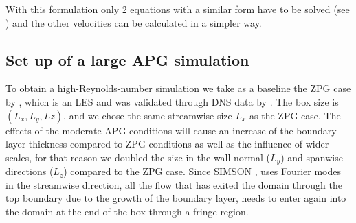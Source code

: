 With this formulation only 2 equations with a similar form have to be solved (see \cite{simson_techrep}) and the other velocities can be calculated in a simpler way.


\subsection{Set up of a large APG simulation}

To obtain a high-Reynolds-number simulation we take as a baseline the ZPG case by \cite{E-AmorZPG}, which is an LES and was validated through DNS data by \cite{schlatter_orlu_2010}.
The box size is $(L_x, L_y , Lz)$, and we chose the same streamwise size $L_x$ as the ZPG case. The effects of the moderate APG conditions will cause an increase of the boundary layer thickness compared to ZPG conditions as well as the influence of wider scales, for that reason we doubled the size in the wall-normal ($L_y$) and spanwise directions ($L_z$) compared to the ZPG case. 
\highlight{\ref{tab:param}}
Since SIMSON \citep{simson_techrep}, uses Fourier modes in the streamwise direction, all the flow that has exited the domain through the top boundary due to the growth of the boundary layer, needs to enter again into the domain at the end of the box through a fringe region. 




